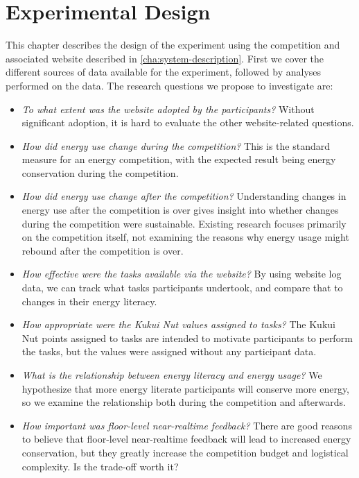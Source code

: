 \chapter{Experimental Design}
\label{cha:ExperimentalDesign}

This chapter describes the design of the experiment using the competition and associated website described in \autoref{cha:system-description}. First we cover the different sources of data available for the experiment, followed by analyses performed on the data. The research questions we propose to investigate are:

\begin{itemize}
	\item \emph{To what extent was the website adopted by the participants?} Without significant adoption, it is hard to evaluate the other website-related questions.
	\item \emph{How did energy use change during the competition?} This is the standard measure for an energy competition, with the expected result being energy conservation during the competition.
	\item \emph{How did energy use change after the competition?} Understanding changes in energy use after the competition is over gives insight into whether changes during the competition were sustainable. Existing research focuses primarily on the competition itself, not examining the reasons why energy usage might rebound after the competition is over.
	\item \emph{How effective were the tasks available via the website?} By using website log data, we can track what tasks participants undertook, and compare that to changes in their energy literacy.
	\item \emph{How appropriate were the Kukui Nut values assigned to tasks?} The Kukui Nut points assigned to tasks are intended to motivate participants to perform the tasks, but the values were assigned without any participant data.
	\item \emph{What is the relationship between energy literacy and energy usage?} We hypothesize that more energy literate participants will conserve more energy, so we examine the relationship both during the competition and afterwards.
	\item \emph{How important was floor-level near-realtime feedback?} There are good reasons to believe that floor-level near-realtime feedback will lead to increased energy conservation, but they greatly increase the competition budget and logistical complexity. Is the trade-off worth it?
\end{itemize}


